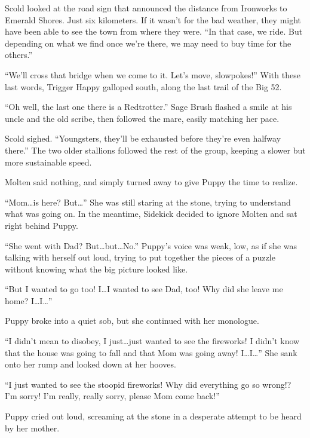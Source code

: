 Scold looked at the road sign that announced the distance from Ironworks to Emerald Shores. Just six kilometers. If it wasn't for the bad weather, they might have been able to see the town from where they were. ``In that case, we ride. But depending on what we find once we're there, we may need to buy time for the others.''

``We'll cross that bridge when we come to it. Let's move, slowpokes!'' With these last words, Trigger Happy galloped south, along the last trail of the Big 52.

``Oh well, the last one there is a Redtrotter.'' Sage Brush flashed a smile at his uncle and the old scribe, then followed the mare, easily matching her pace.

Scold sighed. ``Youngsters, they'll be exhausted before they're even halfway there.'' The two older stallions followed the rest of the group, keeping a slower but more sustainable speed.



\horizonline


Molten said nothing, and simply turned away to give Puppy the time to realize.

``Mom\dots is here? But\dots'' She was still staring at the stone, trying to understand what was going on. In the meantime, Sidekick decided to ignore Molten and sat right behind Puppy.

``She went with Dad? But\dots but\dots No.'' Puppy's voice was weak, low, as if she was talking with herself out loud, trying to put together the pieces of a puzzle without knowing what the big picture looked like.

``But I wanted to go too! I\dots I wanted to see Dad, too! Why did she leave me home? I\dots I\dots''

Puppy broke into a quiet sob, but she continued with her monologue.

``I didn't mean to disobey, I just\dots just wanted to see the fireworks! I didn't know that the house was going to fall and that Mom was going away! I\dots I\dots'' She sank onto her rump and looked down at her hooves.

``I just wanted to see the stoopid fireworks! Why did everything go so wrong!? I'm sorry! I'm really, really sorry, please Mom come back!''

Puppy cried out loud, screaming at the stone in a desperate attempt to be heard by her mother.

